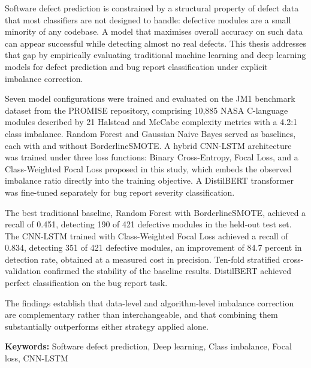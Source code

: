 \documentclass[12pt,a4paper,oneside]{report}
\begin{document}
{\fontsize{11}{14}\selectfont{}
Software defect prediction is constrained by a structural property of defect data that most classifiers are not designed to handle: defective modules are a small minority of any codebase. A model that maximises overall accuracy on such data can appear successful while detecting almost no real defects. This thesis addresses that gap by empirically evaluating traditional machine learning and deep learning models for defect prediction and bug report classification under explicit imbalance correction.

Seven model configurations were trained and evaluated on the JM1 benchmark dataset from the PROMISE repository, comprising 10,885 NASA C-language modules described by 21 Halstead and McCabe complexity metrics with a 4.2:1 class imbalance. Random Forest and Gaussian Naive Bayes served as baselines, each with and without BorderlineSMOTE. A hybrid CNN-LSTM architecture was trained under three loss functions: Binary Cross-Entropy, Focal Loss, and a Class-Weighted Focal Loss proposed in this study, which embeds the observed imbalance ratio directly into the training objective. A DistilBERT transformer was fine-tuned separately for bug report severity classification.

The best traditional baseline, Random Forest with BorderlineSMOTE, achieved a recall of 0.451, detecting 190 of 421 defective modules in the held-out test set. The CNN-LSTM trained with Class-Weighted Focal Loss achieved a recall of 0.834, detecting 351 of 421 defective modules, an improvement of 84.7 percent in detection rate, obtained at a measured cost in precision. Ten-fold stratified cross-validation confirmed the stability of the baseline results. DistilBERT achieved perfect classification on the bug report task.

The findings establish that data-level and algorithm-level imbalance correction are complementary rather than interchangeable, and that combining them substantially outperforms either strategy applied alone.
\par}

\vspace{10pt}
{\fontsize{11}{14}\selectfont\textbf{Keywords:} Software defect prediction, Deep learning, Class imbalance, Focal loss, CNN-LSTM}

\clearpage

\renewcommand{\contentsname}{Table of Contents}
\renewcommand{\listtablename}{List of Tables}
\renewcommand{\listfigurename}{List of Figures}
\end{document}

